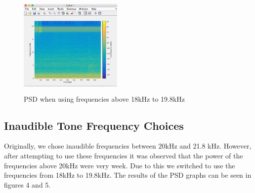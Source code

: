 \documentclass{acm_proc_article-sp}
\begin{document}
\begin{figure}[h]
\caption{PSD when using frequencies above 18kHz to 19.8kHz}
\center
\includegraphics[width=5cm, height=5cm]{Below20}
\end{figure}

\subsection{Inaudible Tone Frequency Choices}
Originally, we chose inaudible frequencies between 20kHz and 21.8 kHz. However, after attempting to use these frequencies it was observed that the power of the frequencies above 20kHz were very week. Due to this we switched to use the frequencies from 18kHz to 19.8kHz. The results of the PSD graphs can be seen in figures 4 and 5.
\end{document}

